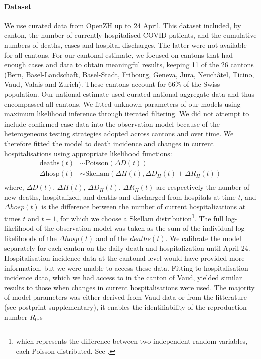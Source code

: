 \paragraph{Dataset} We use curated data from OpenZH\cite{openZH:OpenZHCovid19:2020} up to 24 April. This dataset included, by canton, the number of currently hospitalised COVID patients, and the cumulative numbers of deaths, cases and hospital discharges. The latter were not available for all cantons. For our cantonal estimate, we focused on cantons that had enough cases and data to obtain meaningful results, keeping 11 of the 26 cantons (Bern, Basel-Landschaft, Basel-Stadt, Fribourg, Geneva, Jura, Neuchâtel, Ticino, Vaud, Valais and Zurich). These cantons account for 66\% of the Swiss population. Our national estimate used curated national aggregate data and thus encompassed all cantons\cite{Probst:DaenuprobstCovid19casesswitzerland:2020}. We fitted unknown parameters of our models using maximum likelihood inference through iterated filtering\cite{Ionides:InferenceDynamicLatent:2015}. We did not attempt to include confirmed case data into the observation model because of the heterogeneous testing strategies adopted across cantons and over time. We therefore fitted the model to death incidence and changes in current hospitalisations using appropriate likelihood functions:
\begin{equation}
\begin{split}
 \text{deaths}(t) &\sim \text{Poisson}(\Delta D(t)) \\
\Delta  \text{hosp}(t) &\sim \text{Skellam}(\Delta H(t), \Delta D_H(t) + \Delta R_H(t)) \\
\end{split}
\end{equation}
\noindent where, $\Delta D(t)$, $\Delta H(t)$, $\Delta D_H(t)$, $\Delta R_H(t)$ are respectively the number of new deaths, hospitalized, and deaths and discharged from hospitals at time $t$, and $\Delta hosp(t)$ is the difference between the number of current hospitalizations at times $t$ and $t-1$, for which we choose a Skellam distribution\footnote{which represents the difference between two independent random variables, each Poisson-distributed. See .}. The full log-likelihood of the observation model was taken as the sum of the individual log-likelihoods of the $\Delta hosp(t)$ and of the $deaths(t)$. 
We calibrate the model separately for each canton on the daily death and hospitalization until April 24. Hospitalisation incidence data at the cantonal level would have provided more information, but we were unable to access these data. Fitting to hospitalisation incidence data, which we had access to in the canton of Vaud, yielded similar results to those when changes in current hospitalisations were used. The majority of model parameters was either derived from Vaud data or from the litterature (see postprint supplementary), it enables the identifiability of the reproduction number $R_0$.s 
 
